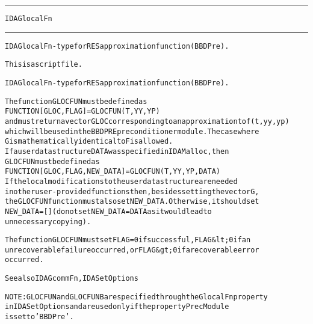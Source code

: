 \begin{samepage}
\hrule
\begin{center}
{\large \verb!IDAGlocalFn!}
\label{p:IDAGlocalFn}
\end{center}
\hrule\vspace{0.1in}



\begin{alltt}
IDAGlocalFn - type for RES approximation function (BBDPre).
\end{alltt}

\end{samepage}



\begin{samepage}


\begin{alltt}
This is a script file. 
\end{alltt}

\end{samepage}



\begin{alltt}
IDAGlocalFn - type for RES approximation function (BBDPre).

   The function GLOCFUN must be defined as 
        FUNCTION [GLOC, FLAG] = GLOCFUN(T,YY,YP)
   and must return a vector GLOC corresponding to an approximation to f(t,yy,yp)
   which will be used in the BBDPRE preconditioner module. The case where
   G is mathematically identical to F is allowed.
   If a user data structure DATA was specified in IDAMalloc, then
   GLOCFUN must be defined as
        FUNCTION [GLOC, FLAG, NEW_DATA] = GLOCFUN(T,YY,YP,DATA)
   If the local modifications to the user data structure are needed 
   in other user-provided functions then, besides setting the vector G,
   the GLOCFUN function must also set NEW_DATA. Otherwise, it should set
   NEW_DATA=[] (do not set NEW_DATA = DATA as it would lead to
   unnecessary copying).

   The function GLOCFUN must set FLAG=0 if successful, FLAG&lt;0 if an
   unrecoverable failure occurred, or FLAG&gt;0 if a recoverable error
   occurred.

   See also IDAGcommFn, IDASetOptions

   NOTE: GLOCFUN and GLOCFUNB are specified through the GlocalFn property
   in IDASetOptions and are used only if the property PrecModule
   is set to 'BBDPre'.
\end{alltt}






\vspace{0.1in}